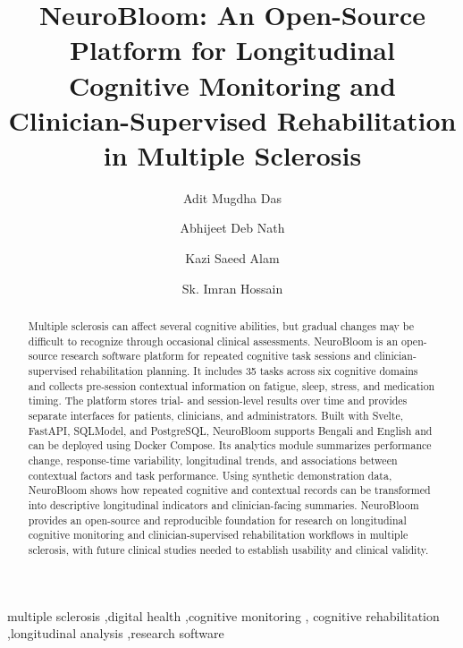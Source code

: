 \documentclass[preprint,12pt,a4paper]{elsarticle}
\begin{document}
\begin{frontmatter}

\title{NeuroBloom: An Open-Source Platform for Longitudinal Cognitive Monitoring and Clinician-Supervised Rehabilitation in Multiple Sclerosis}

\author{Adit Mugdha Das}

\author{Abhijeet Deb Nath}

\author{Kazi Saeed Alam}

\author{Sk. Imran Hossain}


\address{Department of Computer Science and Engineering, Khulna University of Engineering \& Technology, Khulna 9203, Bangladesh}

\begin{abstract}
Multiple sclerosis can affect several cognitive abilities, but gradual changes may be difficult to recognize through occasional clinical assessments. NeuroBloom is an open-source research software platform for repeated cognitive task sessions and clinician-supervised rehabilitation planning. It includes 35 tasks across six cognitive domains and collects pre-session contextual information on fatigue, sleep, stress, and medication timing. The platform stores trial- and session-level results over time and provides separate interfaces for patients, clinicians, and administrators. Built with Svelte, FastAPI, SQLModel, and PostgreSQL, NeuroBloom supports Bengali and English and can be deployed using Docker Compose. Its analytics module summarizes performance change, response-time variability, longitudinal trends, and associations between contextual factors and task performance. Using synthetic demonstration data, NeuroBloom shows how repeated cognitive and contextual records can be transformed into descriptive longitudinal indicators and clinician-facing summaries. NeuroBloom provides an open-source and reproducible foundation for research on longitudinal cognitive monitoring and clinician-supervised rehabilitation workflows in multiple sclerosis, with future clinical studies needed to establish usability and clinical validity.
\end{abstract}


\begin{keyword}
multiple sclerosis \sep digital health \sep cognitive monitoring \sep
cognitive rehabilitation \sep longitudinal analysis \sep research software
\end{keyword}

\end{frontmatter}
\end{document}
